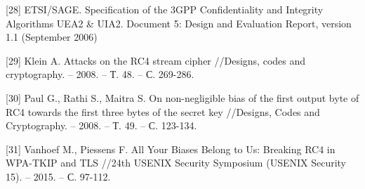 \documentclass[colorthm]{./civarticle}
\begin{document}
[28] ETSI/SAGE. Specification of the 3GPP Confidentiality and
Integrity Algorithms UEA2 & UIA2.
Document 5: Design and Evaluation Report, version 1.1 (September 2006)

[29] Klein A. Attacks on the RC4 stream cipher //Designs, codes and cryptography. – 2008. – Т. 48. – С. 269-286.

[30] Paul G., Rathi S., Maitra S. On non-negligible bias of the first output byte of RC4 towards the first three bytes of the secret key //Designs, Codes and Cryptography. – 2008. – Т. 49. – С. 123-134.

[31] Vanhoef M., Piessens F. All Your Biases Belong to Us: Breaking {RC4} in {WPA-TKIP} and {TLS} //24th USENIX Security Symposium (USENIX Security 15). – 2015. – С. 97-112.

 
\end{document}

